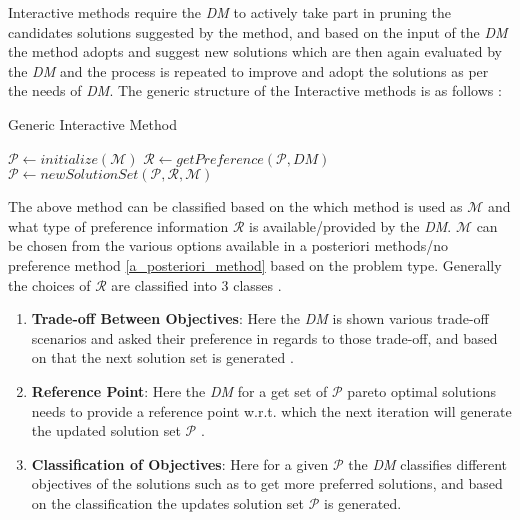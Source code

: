 Interactive methods require the \textit{DM} to actively take part in pruning the candidates solutions suggested by the method, and based on the input of the \textit{DM} the method adopts and suggest new solutions which are then again evaluated by the \textit{DM} and the process is repeated to improve and adopt the solutions as per the needs of \textit{DM}.
\newline\newline The generic structure of the Interactive methods is as follows \cite{miettinen2008introduction}:
\begin{algorithm}
\caption{Generic Interactive Method}\label{algo_generic_interactive_method}
\begin{algorithmic}
\State $\mathcal{P} \gets initialize(\mathcal{M})$ 
\Do
    \State $\mathcal{R} \gets getPreference(\mathcal{P},DM)$
    \State $\mathcal{P} \gets newSolutionSet(\mathcal{P},\mathcal{R},\mathcal{M})$
\end{algorithmic}
\end{algorithm}
The above method can be classified based on the which method is used as $\mathcal{M}$ and what type of preference information $\mathcal{R}$ is available/provided by the \textit{DM}.
\newline \newline $\mathcal{M}$ can be chosen from the various options available in a posteriori methods/no preference method \ref{a_posteriori_method} based on the problem type.
\newline \newline Generally the choices of $\mathcal{R}$ are classified into 3 classes \cite{miettinen2008introduction}.
\begin{enumerate}
    \item \textbf{Trade-off Between Objectives}: Here the \textit{DM} is shown various trade-off scenarios and asked their preference in regards to those trade-off, and based on that the next solution set is generated \cite{zionts1976interactive}.
    \item \textbf{Reference Point}: Here the \textit{DM} for a get set of $\mathcal{P}$ pareto optimal solutions needs to provide a reference point w.r.t. which the next iteration will generate the updated solution set  $\mathcal{P}$ \cite{wierzbicki1986completeness}\cite{wierzbicki2000modern}.
    \item \textbf{Classification of Objectives}: Here for a given $\mathcal{P}$ the \textit{DM} classifies different objectives of the solutions such as to get more preferred solutions, and based on the classification the updates solution set $\mathcal{P}$ is generated.
\end{enumerate}
